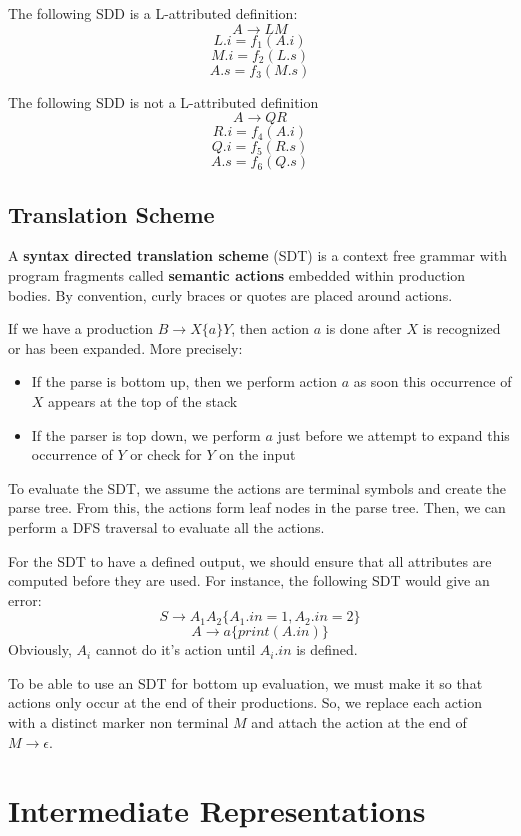 \documentclass[12pt,letterpaper]{book}
\theoremstyle{definition}
\begin{document}
The following SDD is a L-attributed definition:
\[A \rightarrow LM\]
\[L.i = f_1(A.i)\]
\[M.i = f_2(L.s)\]
\[A.s = f_3(M.s)\]

The following SDD is not a L-attributed definition
\[A \rightarrow QR\]
\[R.i = f_4(A.i)\]
\[Q.i = f_5(R.s)\]
\[A.s = f_6(Q.s)\]

\section{Translation Scheme}

A \textbf{syntax directed translation scheme} (SDT) is a context free grammar with program fragments called \textbf{semantic actions}  embedded within production bodies. By convention, curly braces or quotes are placed around actions.

If we have a production $B \rightarrow X \{a\} Y$, then action $a$ is done after $X$ is recognized or has been expanded. More precisely:

\begin{itemize}
  \item If the parse is bottom up, then we perform action $a$ as soon this occurrence of $X$ appears at the top of the stack
  \item If the parser is top down, we perform $a$ just before we attempt to expand this occurrence of $Y$ or check for $Y$ on the input
\end{itemize}

To evaluate the SDT, we assume the actions are terminal symbols and create the parse tree. From this, the actions form leaf nodes in the parse tree. Then, we can perform a DFS traversal to evaluate all the actions.

For the SDT to have a defined output, we should ensure that all attributes are computed before they are used. For instance, the following SDT would give an error:
\[S \rightarrow A_1 A_2 \{A_1.in = 1, A_2.in = 2\}\]
\[A \rightarrow a \{print(A.in)\}\]
Obviously, $A_i$ cannot do it's action until $A_i.in$ is defined.

To be able to use an SDT for bottom up evaluation, we must make it so that actions only occur at the end of their productions. So, we replace each action with a distinct marker non terminal $M$ and attach the action at the end of $M \rightarrow \epsilon$.

\chapter{Intermediate Representations}
\end{document}
